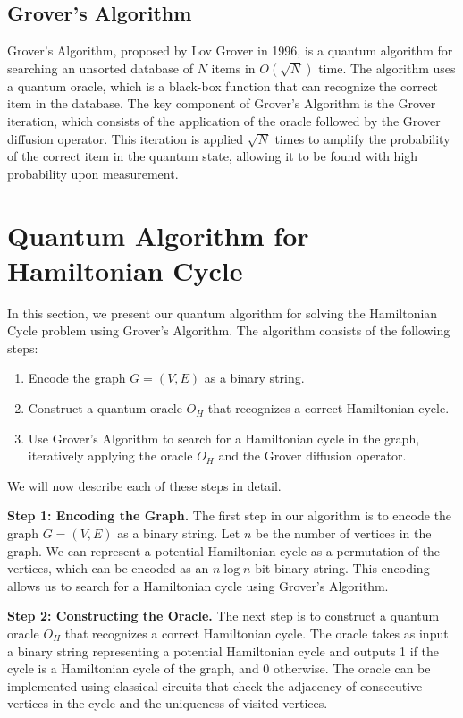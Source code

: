\subsection{Grover's Algorithm}

Grover's Algorithm, proposed by Lov Grover in 1996, is a quantum algorithm for searching an unsorted database of $N$ items in $O(\sqrt{N})$ time. The algorithm uses a quantum oracle, which is a black-box function that can recognize the correct item in the database. The key component of Grover's Algorithm is the Grover iteration, which consists of the application of the oracle followed by the Grover diffusion operator. This iteration is applied $\sqrt{N}$ times to amplify the probability of the correct item in the quantum state, allowing it to be found with high probability upon measurement.

\section{Quantum Algorithm for Hamiltonian Cycle}
\label{sec:algorithm}

In this section, we present our quantum algorithm for solving the Hamiltonian Cycle problem using Grover's Algorithm. The algorithm consists of the following steps:

\begin{enumerate}
  \item Encode the graph $G = (V, E)$ as a binary string.
  \item Construct a quantum oracle $O_H$ that recognizes a correct Hamiltonian cycle.
  \item Use Grover's Algorithm to search for a Hamiltonian cycle in the graph, iteratively applying the oracle $O_H$ and the Grover diffusion operator.
\end{enumerate}

We will now describe each of these steps in detail.

\textbf{Step 1: Encoding the Graph.} The first step in our algorithm is to encode the graph $G = (V, E)$ as a binary string. Let $n$ be the number of vertices in the graph. We can represent a potential Hamiltonian cycle as a permutation of the vertices, which can be encoded as an $n \log n$-bit binary string. This encoding allows us to search for a Hamiltonian cycle using Grover's Algorithm.

\textbf{Step 2: Constructing the Oracle.} The next step is to construct a quantum oracle $O_H$ that recognizes a correct Hamiltonian cycle. The oracle takes as input a binary string representing a potential Hamiltonian cycle and outputs 1 if the cycle is a Hamiltonian cycle of the graph, and 0 otherwise. The oracle can be implemented using classical circuits that check the adjacency of consecutive vertices in the cycle and the uniqueness of visited vertices.

